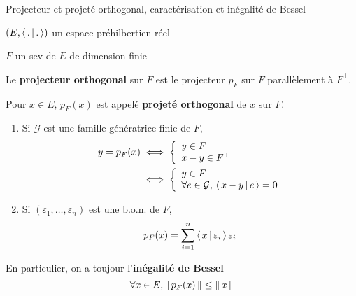         \begin{defitheo}{Projecteur et projeté orthogonal, caractérisation et inégalité de Bessel}{}
            \begin{soient}
                \item $(E,\left<\,.\,\middle|\,.\,\right>)$ un espace préhilbertien réel
                \item $F$ un sev de $E$ de dimension finie
            \end{soient}
            Le \textbf{projecteur orthogonal} sur $F$ est le projecteur $p_F$ sur $F$ parallèlement à $F^{\perp}$. 
            
            Pour $x \in E, \, p_F(x)$ est appelé \textbf{projeté orthogonal} de $x$ sur $F$.
            \begin{enumerate}
                \item Si $\mathcal{G}$ est une famille génératrice finie de $F$, 
                \begin{align*}
                    y = p_F(x) &\iff \et{y \in F}{x - y \in F^{\perp}} \\
                    &\iff \et{y \in F}{\forall e \in \mathcal{G}, \, \spr{x-y}{e}=0}
                \end{align*}
                \item Si $(\varepsilon_1,\ldots,\varepsilon_n)$ est une b.o.n. de $F$, 
                \[ p_F(x) = \sum\limits_{i=1}^n \left<\,x\,\middle|\,\varepsilon_i\,\right>\varepsilon_i \] 
            \end{enumerate}
            En particulier, on a toujour l’\textbf{inégalité de Bessel}
            \[ \forall x \in E, \left\lVert\,p_F(x)\,\right\rVert \leq \left\lVert\,x\,\right\rVert \]
        \end{defitheo}

